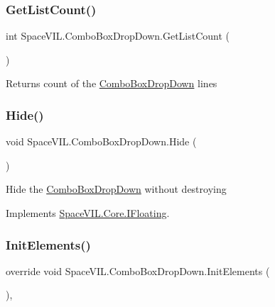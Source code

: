 \subsubsection{\texorpdfstring{Get\+List\+Count()}{GetListCount()}}
{\footnotesize\ttfamily int Space\+V\+I\+L.\+Combo\+Box\+Drop\+Down.\+Get\+List\+Count (\begin{DoxyParamCaption}{ }\end{DoxyParamCaption})\hspace{0.3cm}{\ttfamily [inline]}}



Returns count of the \mbox{\hyperlink{class_space_v_i_l_1_1_combo_box_drop_down}{Combo\+Box\+Drop\+Down}} lines 

\mbox{\label{class_space_v_i_l_1_1_combo_box_drop_down_accb3813befaac8d9d0de181c37cf18ac}} 
\subsubsection{\texorpdfstring{Hide()}{Hide()}}
{\footnotesize\ttfamily void Space\+V\+I\+L.\+Combo\+Box\+Drop\+Down.\+Hide (\begin{DoxyParamCaption}{ }\end{DoxyParamCaption})\hspace{0.3cm}{\ttfamily [inline]}}



Hide the \mbox{\hyperlink{class_space_v_i_l_1_1_combo_box_drop_down}{Combo\+Box\+Drop\+Down}} without destroying 



Implements \mbox{\hyperlink{interface_space_v_i_l_1_1_core_1_1_i_floating}{Space\+V\+I\+L.\+Core.\+I\+Floating}}.

\mbox{\label{class_space_v_i_l_1_1_combo_box_drop_down_aa38b0ff2634defca3efb3a25e0a599cf}} 
\subsubsection{\texorpdfstring{Init\+Elements()}{InitElements()}}
{\footnotesize\ttfamily override void Space\+V\+I\+L.\+Combo\+Box\+Drop\+Down.\+Init\+Elements (\begin{DoxyParamCaption}{ }\end{DoxyParamCaption})\hspace{0.3cm}{\ttfamily [inline]}, {\ttfamily [virtual]}}



